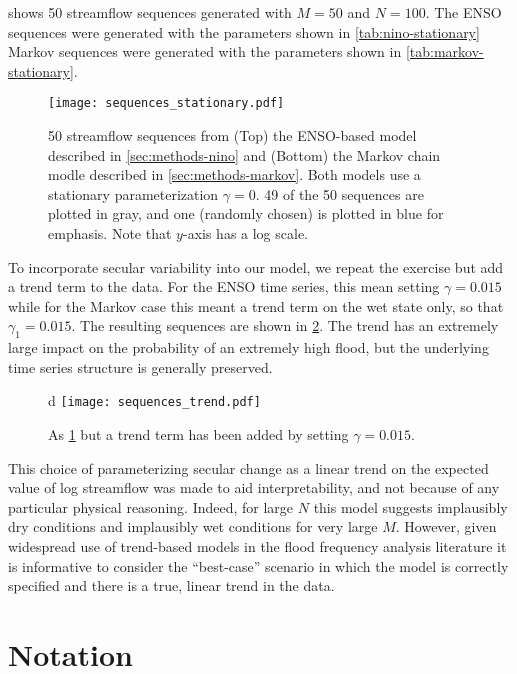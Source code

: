 \documentclass[12pt]{article}
\begin{document}
 shows 50 streamflow sequences generated with $M=50$ and $N=100$.
The ENSO sequences were generated with the parameters shown in \cref{tab:nino-stationary} Markov sequences were generated with the parameters shown in \cref{tab:markov-stationary}.
\begin{figure}[b]
  \texttt{[image: sequences\_stationary.pdf]}  
  \caption{
    50 streamflow sequences from (Top) the ENSO-based model described in \cref{sec:methods-nino} and (Bottom) the Markov chain modle described in \cref{sec:methods-markov}.
    Both models use a stationary parameterization $\gamma=0$.
    49 of the 50 sequences are plotted in gray, and one (randomly chosen) is plotted in blue for emphasis.
    Note that $y$-axis has a log scale.\label{fig:stationary-sequences}
  }
\end{figure}

To incorporate secular variability into our model, we repeat the exercise but add a trend term to the data.
For the ENSO time series, this mean setting \(\gamma=0.015\) while for the Markov case this meant a trend term on the wet state only, so that \(\gamma_1=0.015\).
The resulting sequences are shown in \cref{fig:trend-sequences}.
The trend has an extremely large impact on the probability of an extremely high flood, but the underlying time series structure is generally preserved.
\begin{figure}[b]d
  \texttt{[image: sequences\_trend.pdf]}
  \caption{
    As \cref{fig:stationary-sequences} but a trend term has been added by setting \(\gamma=0.015\).\label{fig:trend-sequences}
  }
\end{figure}

This choice of parameterizing secular change as a linear trend on the expected value of log streamflow was made to aid interpretability, and not because of any particular physical reasoning.
Indeed, for large $N$ this model suggests implausibly dry conditions and implausibly wet conditions for very large $M$.
However, given widespread use of trend-based models in the flood frequency analysis literature it is informative to consider the ``best-case'' scenario in which the model is correctly specified and there is a true, linear trend in the data.

\section{Notation}
\end{document}

